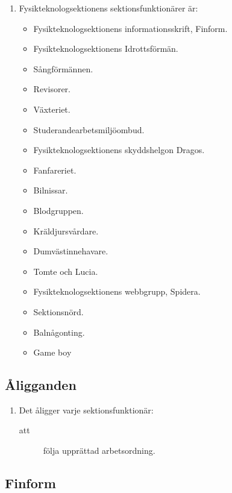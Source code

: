\documentclass[11pt,a4paper]{article}
\begin{document}
\begin{enumerate}[\thesubsection .1]

  \item Fysikteknologsektionens sektionsfunktionärer är:
    \begin{itemize}
      \item Fysikteknologsektionens informationsskrift, Finform.
      \item Fysikteknologsektionens Idrottsförmän.
      \item Sångförmännen.
      \item Revisorer.
      \item Växteriet.
      \item Studerandearbetsmiljöombud.
      \item Fysikteknologsektionens skyddshelgon Dragos.
      \item Fanfareriet.
      \item Bilnissar.
      \item Blodgruppen.
      \item Kräldjursvårdare.
      \item Dumvästinnehavare.
      \item Tomte och Lucia.
      \item Fysikteknologsektionens webbgrupp, Spidera.
      \item Sektionsnörd.
      \item Balnågonting.
      \item Game boy
    \end{itemize}

\end{enumerate}

\subsection{Åligganden}

\begin{enumerate}[\thesubsection .1]

  \item Det åligger varje sektionsfunktionär:
    \begin{description}
    \item[att] följa upprättad arbetsordning.
  
    \end{description}

\end{enumerate}

\subsection{Finform}
\end{document}
